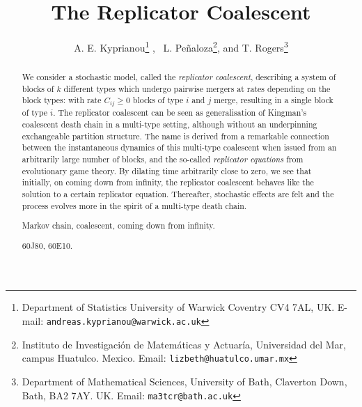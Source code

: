 \documentclass[12pt, leqno]{article}
\title{The Replicator Coalescent}
\author{A. E. Kyprianou\thanks{
Department of Statistics
University of Warwick
Coventry
CV4 7AL, UK. E-mail: \texttt{andreas.kyprianou@warwick.ac.uk}}
, \ L. Pe\~{n}aloza\thanks{Instituto de Investigación de Matem\'aticas y Actuaría, 
Universidad del Mar, campus Huatulco. Mexico. Email: \texttt{lizbeth@huatulco.umar.mx}},    
 and 
 T. Rogers\thanks{Department of Mathematical Sciences, University of Bath, Claverton Down, Bath, BA2 7AY. UK. Email: \texttt{ma3tcr@bath.ac.uk}}
 }
\begin{document}
\maketitle
\vspace{-0.5cm}
\begin{abstract}
 We consider a stochastic model, called the {\it replicator coalescent}, describing a system of blocks of $k$ different types which undergo pairwise mergers at rates depending on the block types: with rate $C_{ij}\geq0$ blocks of type $i$ and $j$ merge, resulting in a single block of type $i$. The replicator coalescent can be seen as generalisation of Kingman's coalescent death chain in a multi-type setting, although without an underpinning exchangeable partition structure. The name is derived from a remarkable connection  between the instantaneous dynamics of this multi-type coalescent when issued from an arbitrarily large number of blocks, and the so-called {\it replicator equations} from evolutionary game theory. By dilating time arbitrarily close to zero, we see that initially, on coming down from infinity, the replicator coalescent behaves like the solution to a certain replicator equation. Thereafter, stochastic effects are felt and the process evolves more in the spirit of a multi-type death chain.
\medskip


  Markov chain, coalescent, coming down from infinity.

\medskip

   60J80, 60E10.
\end{abstract}
\end{document}
